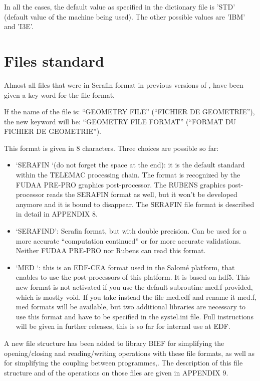  In all the cases, the default value as specified in the dictionary file is 'STD' (default value of the machine being used). The other possible values are 'IBM' and 'I3E'.


\section{ Files standard}

 Almost all files that were in Serafin format in previous versions of \tomawac, have been given a key-word for the file format.

 If the name of the file is: ``GEOMETRY FILE'' (``FICHIER DE GEOMETRIE''), the new keyword will be: ``GEOMETRY FILE FORMAT'' (``FORMAT DU FICHIER DE GEOMETRIE'').

 This format is given in 8 characters. Three choices are possible so far:

\begin{itemize}
\item  `SERAFIN `(do not forget the space at the end): it is the default standard within the TELEMAC processing chain. The format is recognized by the FUDAA PRE-PRO graphics post-processor. The RUBENS graphics post-processor reads the SERAFIN format as well, but it won't be developed anymore and it is bound to disappear. The SERAFIN file format is described in detail in APPENDIX 8.

\item  `SERAFIND': Serafin format, but with double precision. Can be used for a more accurate ``computation continued'' or for more accurate validations. Neither FUDAA PRE-PRO nor Rubens can read this format.

\item  `MED  `: this is an EDF-CEA format used in the Salomé platform, that enables to use the post-processors of this platform. It is based on hdf5. This new format is not activated if you use the default subroutine med.f provided, which is mostly void. If you take instead the file med.edf and rename it med.f, med formats will be available, but two additional libraries are necessary to use this format and have to be specified in the systel.ini file. Full instructions will be given in further releases, this is so far for internal use at EDF.
\end{itemize}

 A new file structure has been added to library BIEF for simplifying the opening/closing and reading/writing operations with these file formats, as well as for simplifying the coupling between programmes,. The description of this file structure and of the operations on those files are given in APPENDIX 9.

